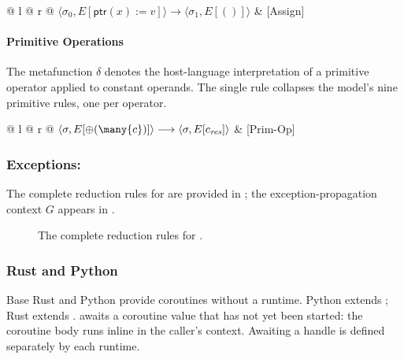 \noindent
\begin{tabular*}{\linewidth}{@{} l @{\extracolsep{\fill}} r @{}}
$\langle \sigma_0, E[\mathsf{ptr}(x) := v] \rangle \longrightarrow \langle \sigma_1, E[()] \rangle$ & [Assign] \\
\end{tabular*}\vspace{1em}

\paragraph{Primitive Operations}
The metafunction $\delta$ denotes the host-language interpretation of a primitive operator applied to constant operands. The single rule  collapses the model's nine primitive rules, one per operator.

\noindent
\begin{tabular*}{\linewidth}{@{} l @{\extracolsep{\fill}} r @{}}
$\langle \sigma, E[\oplus(\many{c})] \rangle \longrightarrow \langle \sigma, E[c_{\mathit{res}}] \rangle$ & [Prim-Op] \\
\end{tabular*}

\subsubsection{Exceptions: \exn}

The complete reduction rules for \exn are provided in ; the exception-propagation context $G$ appears in .

\begin{figure}[h]
  
  \cprotect\caption{The complete reduction rules for \exn.}
  \label{fig:app:exn-rules}
\end{figure}

\subsubsection{Rust and Python}

Base Rust and Python provide coroutines without a runtime. Python extends \exn; Rust extends \lc.  awaits a coroutine value that has not yet been started: the coroutine body runs inline in the caller's context. Awaiting a \task handle is defined separately by each runtime.

